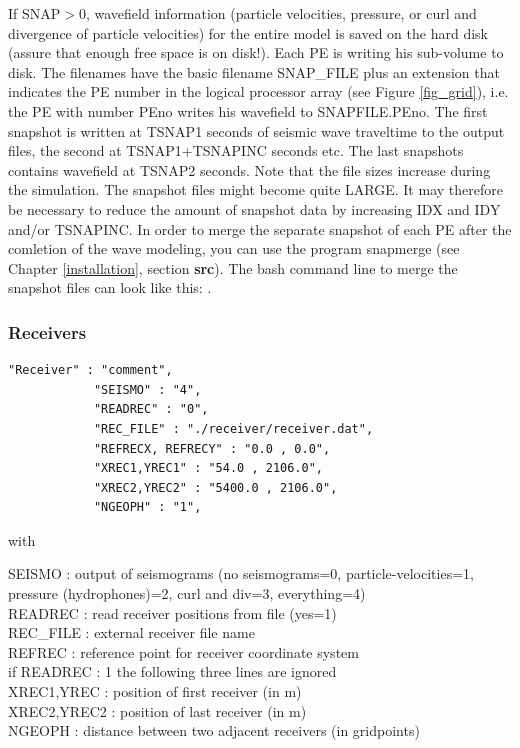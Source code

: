 \documentclass[11pt,onecolumn,oneside]{article}
\begin{document}
If SNAP$>0$, wavefield information (particle velocities, pressure, or curl and divergence of particle velocities) for the entire model is saved on the hard disk (assure that enough free space is on disk!). Each PE is writing his sub-volume to disk. The filenames have the basic filename SNAP\_FILE plus an extension that indicates the PE number in the logical processor array (see Figure \ref{fig_grid}), i.e. the PE with number PEno writes his wavefield to SNAPFILE.PEno. The first snapshot is written at TSNAP1 seconds of seismic wave traveltime to the output files, the second at TSNAP1+TSNAPINC seconds etc. The last snapshots contains wavefield at TSNAP2 seconds. Note that the file sizes increase during the simulation. The snapshot files might become quite LARGE. It may therefore be necessary to reduce the amount of snapshot data by increasing IDX and IDY and/or TSNAPINC. In order to merge the separate snapshot of each PE after the comletion of the wave modeling, you can use the program snapmerge (see Chapter \ref{installation}, section \textbf{src}). The bash command line to merge the snapshot files can look like this: .


\subsubsection{Receivers}
\begin{verbatim}
"Receiver" : "comment",
			"SEISMO" : "4",
			"READREC" : "0",
			"REC_FILE" : "./receiver/receiver.dat",
			"REFRECX, REFRECY" : "0.0 , 0.0",
			"XREC1,YREC1" : "54.0 , 2106.0",
			"XREC2,YREC2" : "5400.0 , 2106.0",
			"NGEOPH" : "1",
\end{verbatim}

with

SEISMO : output of seismograms (no seismograms=0, particle-velocities=1, pressure (hydrophones)=2, curl and div=3, everything=4)\\
READREC : read receiver positions from file (yes=1)\\
REC\_FILE : external receiver file name\\
REFREC : reference point for receiver coordinate system\\
if READREC : 1 the following three lines are ignored\\
XREC1,YREC : position of first receiver (in m) \\
XREC2,YREC2 : position of last receiver (in m)\\
NGEOPH : distance between two adjacent receivers (in gridpoints)\\
\end{document}
